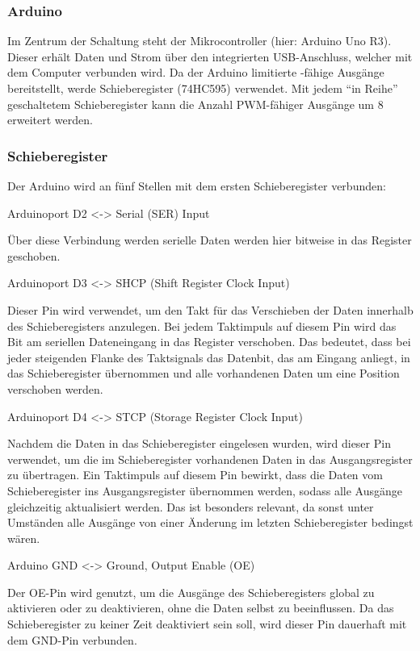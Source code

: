 \subsubsection{Arduino}

Im Zentrum der Schaltung steht der Mikrocontroller (hier: Arduino Uno R3).
Dieser erhält Daten und Strom über den integrierten USB-Anschluss, welcher mit dem Computer verbunden wird.
Da der Arduino limitierte -fähige Ausgänge bereitstellt, werde Schieberegister (74HC595) verwendet.
Mit jedem \enquote{in Reihe} geschaltetem Schieberegister kann die Anzahl \ac{PWM}-fähiger Ausgänge um 8 erweitert werden.

\subsubsection{Schieberegister}

Der Arduino wird an fünf Stellen mit dem ersten Schieberegister verbunden:

Arduinoport D2 <-> Serial (SER) Input

Über diese Verbindung werden serielle Daten werden hier bitweise in das Register geschoben.

Arduinoport D3 <-> SHCP (Shift Register Clock Input)

Dieser Pin wird verwendet, um den Takt für das Verschieben der Daten innerhalb des Schieberegisters anzulegen.
Bei jedem Taktimpuls auf diesem Pin wird das Bit am seriellen Dateneingang in das Register verschoben.
Das bedeutet, dass bei jeder steigenden Flanke des Taktsignals das Datenbit, das am Eingang anliegt, in das Schieberegister übernommen und alle vorhandenen Daten um eine Position verschoben werden.

Arduinoport D4 <-> STCP (Storage Register Clock Input)

Nachdem die Daten in das Schieberegister eingelesen wurden, wird dieser Pin verwendet, um die im Schieberegister vorhandenen Daten in das Ausgangsregister zu übertragen.
Ein Taktimpuls auf diesem Pin bewirkt, dass die Daten vom Schieberegister ins Ausgangsregister übernommen werden, sodass alle Ausgänge gleichzeitig aktualisiert werden.
Das ist besonders relevant, da sonst unter Umständen alle Ausgänge von einer Änderung im letzten Schieberegister bedingst wären.

Arduino GND <-> Ground, Output Enable (OE)

Der OE-Pin wird genutzt, um die Ausgänge des Schieberegisters global zu aktivieren oder zu deaktivieren, ohne die Daten selbst zu beeinflussen.
Da das Schieberegister zu keiner Zeit deaktiviert sein soll, wird dieser Pin dauerhaft mit dem GND-Pin verbunden.

